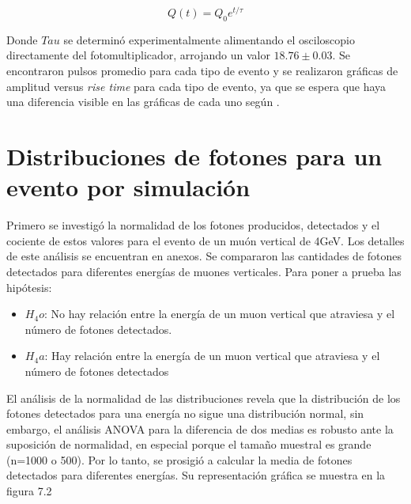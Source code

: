 \documentclass{book}
\begin{document}
\begin{equation}
Q(t)=Q_0e^{t/\tau}
\end{equation}

Donde $Tau$ se determin\'o experimentalmente alimentando el osciloscopio directamente del fotomultiplicador, arrojando un valor $18.76\pm0.03$. Se encontraron pulsos promedio para cada tipo de evento y se realizaron gr\'aficas de amplitud versus \textit{rise time} para cada tipo de evento, ya que se espera que haya una diferencia visible en las gr\'aficas de cada uno seg\'un \citep{}.



\section{Distribuciones de fotones para un evento por simulaci\'on}

Primero se investig\'o la normalidad de los fotones producidos, detectados y el cociente de estos valores para el evento de un mu\'on vertical de 4GeV. Los detalles de este an\'alisis se encuentran en anexos. Se compararon las cantidades de fotones detectados para diferentes energ\'ias de muones verticales. Para poner a prueba las hip\'otesis:

\begin{itemize}
\item $H_4o$: No hay relaci\'on entre la energ\'ia de un muon vertical que atraviesa y el n\'umero de fotones detectados.
\item $H_4a$: Hay relaci\'on entre la energ\'ia de un muon vertical que atraviesa y el n\'umero de fotones detectados
\end{itemize}

El an\'alisis de la normalidad de las distribuciones revela que la distribuci\'on de los fotones detectados para una energ\'ia no sigue una distribuci\'on normal, sin embargo, el an\'alisis ANOVA para la diferencia de dos medias es robusto ante la suposici\'on de normalidad, en especial porque el tama\~no muestral es grande (n=1000 o 500). Por lo tanto, se prosigi\'o a calcular la media de fotones detectados para diferentes energ\'ias. Su representaci\'on gr\'afica se muestra en la figura 7.2
\end{document}
